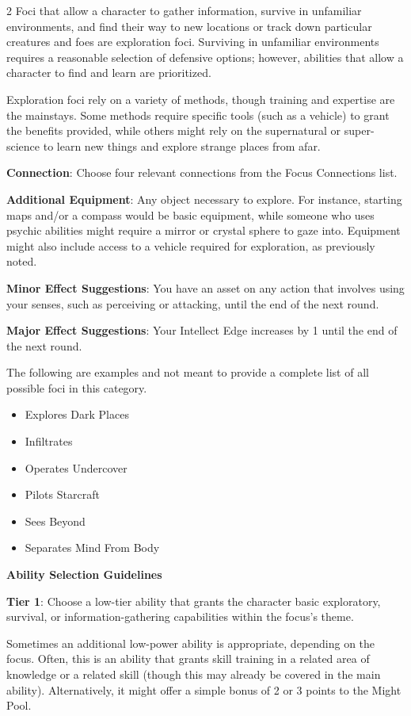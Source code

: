 \begin{multicols}{2}
Foci that allow a character to gather information, survive in unfamiliar environments, and find their way to new locations or track down particular creatures and foes are exploration foci. Surviving in unfamiliar environments requires a reasonable selection of defensive options; however, abilities that allow a character to find and learn are prioritized. 

Exploration foci rely on a variety of methods, though training and expertise are the mainstays. Some methods require specific tools (such as a vehicle) to grant the benefits provided, while others might rely on the supernatural or super-science to learn new things and explore strange places from afar.

\textbf{Connection}: Choose four relevant connections from the Focus Connections list. 

\textbf{Additional Equipment}: Any object necessary to explore. For instance, starting maps and/or
a compass would be basic equipment, while someone who uses psychic abilities might require a mirror or crystal sphere to gaze into. Equipment might also include access to a vehicle required for exploration, as previously noted.

\textbf{Minor Effect Suggestions}: You have an asset on any action that involves using your senses, such as perceiving or attacking, until the end of the next round.

\textbf{Major Effect Suggestions}: Your Intellect Edge increases by 1 until the end of the next round.

The following are examples and not meant to provide a complete list of all possible foci in this category.

\begin{itemize}
\item Explores Dark Places
\item Infiltrates
\item Operates Undercover
\item Pilots Starcraft
\item Sees Beyond
\item Separates Mind From Body
\end{itemize}

\textbf{Ability Selection Guidelines}

\textbf{Tier 1}: Choose a low-tier ability that grants the character basic exploratory, survival, or information-gathering capabilities within the focus’s theme.

Sometimes an additional low-power ability is appropriate, depending on the focus. Often, this is an ability that grants skill training in a related area of knowledge or a related skill (though this may already be covered in the main ability). Alternatively, it might offer a simple bonus of 2 or 3 points to the Might Pool.


\end{multicols}
